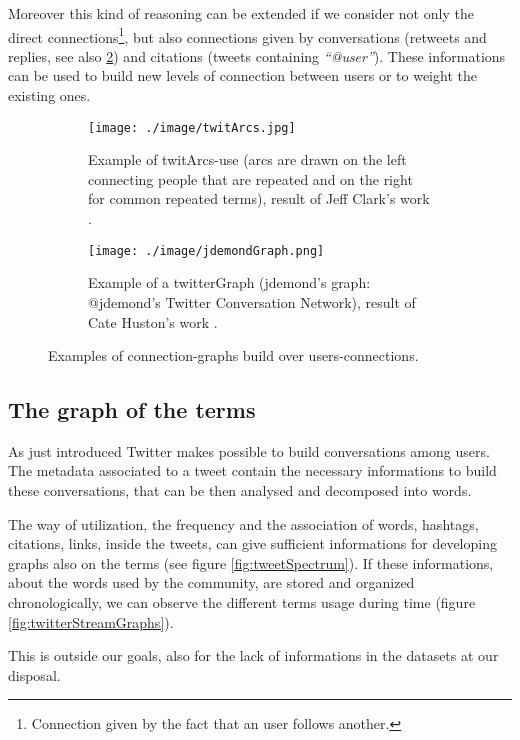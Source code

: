 \documentclass[a4paper,11pt,oneside]{article}
\begin{document}
Moreover this kind of reasoning can be extended if we consider not only the direct connections\footnote{Connection given by the fact that an user follows another.}, but also connections given by conversations (retweets and replies, see also \ref{fig:twitterGraph}) and citations (tweets containing \emph{``@user''}).
These informations can be used to build new levels of connection between users or to weight the existing ones.

\begin{figure}[htbp]
  \begin{subfigure}[h]{\textwidth}
    \centering
    \texttt{[image: ./image/twitArcs.jpg]}
    \caption{Example of twitArcs-use (arcs are drawn on the left connecting people that are repeated and on the right for common repeated terms), result of Jeff Clark's work \cite{clark3}.}
    \label{fig:twitArcs}
  \end{subfigure}
  \hspace{8mm}
  \begin{subfigure}[h]{\textwidth}
    \centering
    \texttt{[image: ./image/jdemondGraph.png]}
    \caption{Example of a twitterGraph (jdemond's graph: @jdemond's Twitter Conversation Network), result of Cate Huston's work \cite{huston}.}
    \label{fig:twitterGraph}
   \end{subfigure}
   \caption{Examples of connection-graphs build over users-connections.}
  \label{fig:graph}
\end{figure}

\subsection{The graph of the terms}
As just introduced Twitter makes possible to build conversations among users. The metadata associated to a tweet contain the necessary informations to build these conversations, that can be then analysed and decomposed into words.

The way of utilization, the frequency and the association of words, hashtags, citations, links, inside the tweets, can give sufficient informations for developing graphs also on the terms (see figure \ref{fig:tweetSpectrum}). If these informations, about the words used by the community, are stored and organized chronologically, we can observe the different terms usage during time (figure \ref{fig:twitterStreamGraphs}).

This is outside our goals, also for the lack of informations in the datasets at our disposal.
\end{document}
